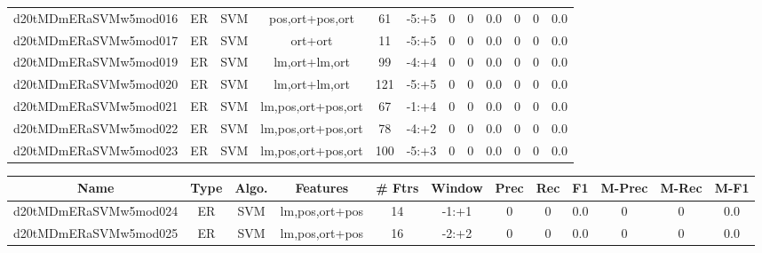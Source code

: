 \documentclass[a4paper]{article}
\begin{document}
\begin{landscape}
\begin{center}
\begin{tabular}{ |c|c|c|c|c|c|c|c|c|c|c|c|}
 
 	
 	\small{ d20tMDmERaSVMw5mod016 } & ER & SVM & pos,ort+pos,ort  &  61 &  -5:+5  &  0 & 0 & 0.0  &  0 & 0 & 0.0 \\
 	

 
 	
 	\small{ d20tMDmERaSVMw5mod017 } & ER & SVM & ort+ort  &  11 &  -5:+5  &  0 & 0 & 0.0  &  0 & 0 & 0.0 \\
 	

 
 	
 	\small{ d20tMDmERaSVMw5mod019 } & ER & SVM & lm,ort+lm,ort  &  99 &  -4:+4  &  0 & 0 & 0.0  &  0 & 0 & 0.0 \\
 	

 
 	
 	\small{ d20tMDmERaSVMw5mod020 } & ER & SVM & lm,ort+lm,ort  &  121 &  -5:+5  &  0 & 0 & 0.0  &  0 & 0 & 0.0 \\
 	

 
 	
 	\small{ d20tMDmERaSVMw5mod021 } & ER & SVM & lm,pos,ort+pos,ort  &  67 &  -1:+4  &  0 & 0 & 0.0  &  0 & 0 & 0.0 \\
 	

 
 	
 	\small{ d20tMDmERaSVMw5mod022 } & ER & SVM & lm,pos,ort+pos,ort  &  78 &  -4:+2  &  0 & 0 & 0.0  &  0 & 0 & 0.0 \\
 	

 
 	
 	\small{ d20tMDmERaSVMw5mod023 } & ER & SVM & lm,pos,ort+pos,ort  &  100 &  -5:+3  &  0 & 0 & 0.0  &  0 & 0 & 0.0 \\
 	
 \hline
\end{tabular}
\end{center}




\begin{center}
\begin{tabular}{ |c|c|c|c|c|c|c|c|c|c|c|c|} 
 \hline
 	Name & Type & Algo. & Features & \# Ftrs & Window & Prec & Rec & F1 & M-Prec & M-Rec & M-F1\\
 \hline

 	

 
 	
 	\small{ d20tMDmERaSVMw5mod024 } & ER & SVM & lm,pos,ort+pos  &  14 &  -1:+1  &  0 & 0 & 0.0  &  0 & 0 & 0.0 \\
 	

 
 	
 	\small{ d20tMDmERaSVMw5mod025 } & ER & SVM & lm,pos,ort+pos  &  16 &  -2:+2  &  0 & 0 & 0.0  &  0 & 0 & 0.0 \\
 	


\end{tabular}
\end{center}
\end{landscape}
\end{document}
